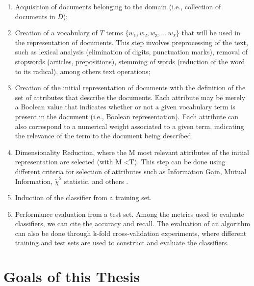\begin{enumerate}
\item  Acquisition of documents belonging to the domain (i.e.,
collection of documents in $D$);
\item Creation of a vocabulary of $T$ terms  $\{w_1,w_2,w_3,\ldots\,w_T\}$ that will be used in the representation of documents. This step involves preprocessing of the text, such as lexical analysis (elimination of digits, punctuation marks), removal of stopwords (articles, prepositions), stemming of words (reduction of the word to its radical), among others text operations;

\item Creation of the initial representation of documents with the definition of the set of attributes that describe the documents. Each attribute may be merely a Boolean value that indicates whether or not a given vocabulary term is present in the document (i.e., Boolean representation).  Each attribute can also correspond to a numerical weight associated to a given term, indicating the relevance of the term to the document being described. 

\item Dimensionality Reduction, where the M most relevant attributes of the initial representation are selected (with M <T). This step can be done using different criteria for selection of attributes such as Information Gain, Mutual Information, $\tilde{\chi}^2$ statistic, and others \cite{Yang:1997}.

\item Induction of the classifier from a training set. %

\item Performance evaluation from a test set. Among the metrics used to evaluate classifiers, we can cite the accuracy and recall. The evaluation of an algorithm can also be done through k-fold cross-validation experiments, where different training and test sets are used to construct and evaluate the classifiers. %

\end{enumerate}


\section{\hspace*{3pt}Goals of this Thesis}

